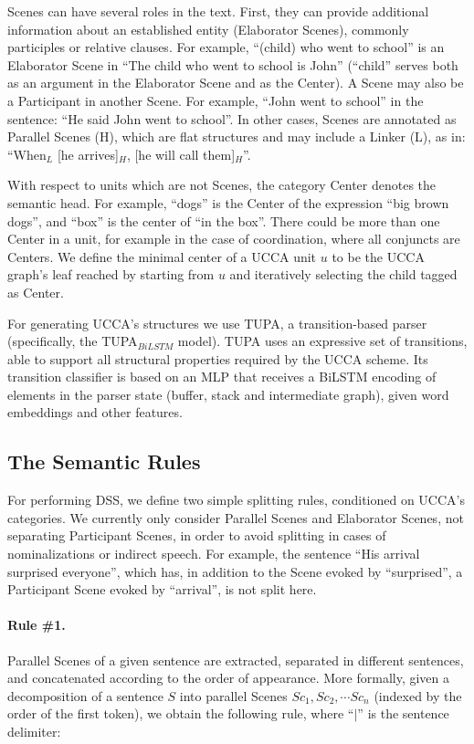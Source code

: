 \documentclass[11pt,a4paper]{article}
\begin{document}
Scenes can have several roles in the text. First, they can provide additional information about an established entity 
(Elaborator Scenes), commonly participles or relative clauses. For example, ``(child) who went to school'' is an Elaborator Scene 
in ``The child who went to school is John'' (``child'' serves both as an argument in the Elaborator Scene and as the Center). 
A Scene may also be a Participant in another Scene. For example, ``John went to school'' in the sentence: ``He said John went to school''. 
In other cases, Scenes are annotated as Parallel Scenes (H), which are flat structures and may include a Linker (L), 
as in:  ``When$_L$ [he arrives]$_H$, [he will call them]$_H$''.

With respect to units which are not Scenes, the category Center denotes the semantic head. For example, ``dogs'' is the 
Center of the expression ``big brown dogs'', and ``box'' is the center of ``in the box''. There could be more than one 
Center in a unit, for example in the case of coordination, where all conjuncts are Centers. We define the minimal center of a 
UCCA unit $u$ to be the UCCA graph's leaf reached by starting from $u$ and iteratively selecting the child tagged as Center.

For generating UCCA's structures we use TUPA, a transition-based parser
\citep{H17} (specifically, the TUPA$_{BiLSTM}$ model). TUPA uses an
expressive set of transitions, able to support all structural properties
required by the UCCA scheme. Its transition classifier is based on an MLP
that receives a BiLSTM encoding of elements in the parser state (buffer,
stack and intermediate graph), given word embeddings and other features.

\vspace{-0.1cm}
\subsection{The Semantic Rules} \label{sec:rules}

For performing DSS, we define two simple splitting rules, conditioned on UCCA's categories.
We currently only consider Parallel Scenes and Elaborator Scenes, not 
separating Participant Scenes, in order to avoid splitting in cases of nominalizations or indirect speech.
For example, the sentence ``His arrival surprised everyone'', which has, in addition to the Scene evoked by ``surprised'', a Participant Scene evoked by ``arrival'', is not split here.

\paragraph{Rule \#1.}
Parallel Scenes of a given sentence are extracted, separated in different sentences, 
and concatenated according to the order of appearance. More formally, given a 
decomposition of a sentence $S$ into parallel Scenes $Sc_{1},Sc_{2}, \cdots Sc_{n}$ 
(indexed by the order of the first token), we obtain the following rule, 
where ``$|$'' is the sentence delimiter:
\vspace{-0.6cm}
\end{document}

